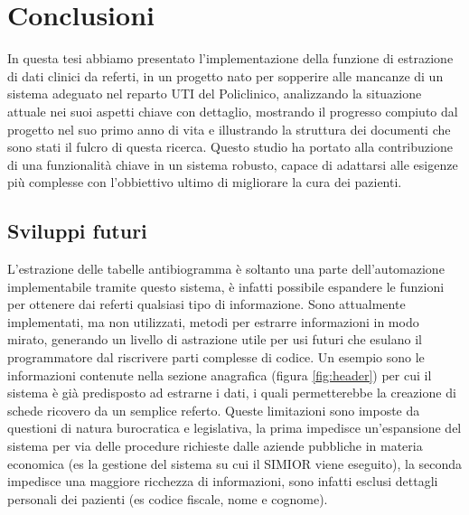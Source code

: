 \chapter{Conclusioni}
In questa tesi abbiamo presentato l'implementazione della funzione di estrazione di dati clinici da referti, in un progetto nato per sopperire alle mancanze di un sistema adeguato nel reparto UTI del Policlinico, analizzando la situazione attuale nei suoi aspetti chiave con dettaglio, mostrando il progresso compiuto dal progetto nel suo primo anno di vita e illustrando la struttura dei documenti che sono stati il fulcro di questa ricerca. Questo studio ha portato alla contribuzione di una funzionalità chiave in un sistema robusto, capace di adattarsi alle esigenze più complesse con l'obbiettivo ultimo di migliorare la cura dei pazienti.

\section{Sviluppi futuri}
L'estrazione delle tabelle antibiogramma è soltanto una parte dell'automazione implementabile tramite questo sistema, è infatti possibile espandere le funzioni per ottenere dai referti qualsiasi tipo di informazione. 
Sono attualmente implementati, ma non utilizzati, metodi per estrarre informazioni in modo mirato, generando un livello di astrazione utile per usi futuri che esulano il programmatore dal riscrivere parti complesse di codice.
Un esempio sono le informazioni contenute nella sezione anagrafica (figura \ref{fig:header}) per cui il sistema è già predisposto ad estrarne i dati, i quali permetterebbe la creazione di schede ricovero da un semplice referto.
Queste limitazioni sono imposte da questioni di natura burocratica e legislativa, la prima impedisce un'espansione del sistema per via delle procedure richieste dalle aziende pubbliche in materia economica (es la gestione del sistema su cui il SIMIOR viene eseguito), la seconda impedisce una maggiore ricchezza di informazioni, sono infatti esclusi dettagli personali dei pazienti (es codice fiscale, nome e cognome). 

